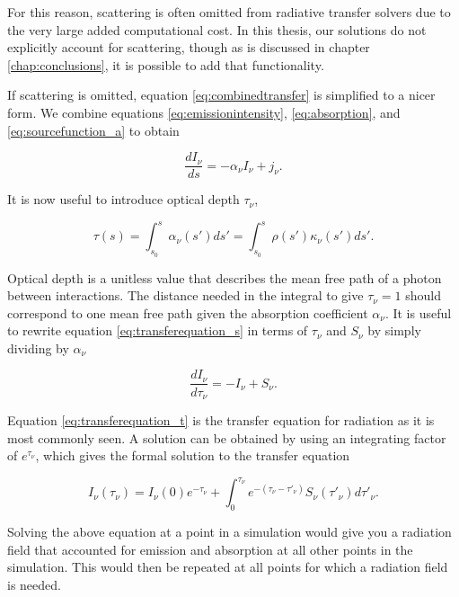 For this reason, scattering is often omitted from radiative transfer solvers due to the very large added computational cost. In this thesis, our solutions do not explicitly account for scattering, though as is discussed in chapter \ref{chap:conclusions}, it is possible to add that functionality.

If scattering is omitted, equation \ref{eq:combinedtransfer} is simplified to a nicer form. We combine equations \ref{eq:emissionintensity}, \ref{eq:absorption}, and \ref{eq:sourcefunction_a} to obtain

\begin{equation}
\label{eq:transferequation_s}
\frac{dI_{\nu}}{ds} = -\alpha_{\nu}I_{\nu} + j_{\nu}.
\end{equation}

It is now useful to introduce optical depth $\tau_{\nu}$,

\begin{equation}
\label{eq:opticaldepth}
\tau(s) = \int_{s_0}^{s} \alpha_{\nu}(s')ds' = \int_{s_0}^{s} \rho(s') \kappa_{\nu}(s') ds'.
\end{equation}

Optical depth is a unitless value that describes the mean free path of a photon between interactions. The distance needed in the integral to give $\tau_{\nu} = 1$ should correspond to one mean free path given the absorption coefficient $\alpha_{\nu}$. It is useful to rewrite equation \ref{eq:transferequation_s} in terms of $\tau_{\nu}$ and $S_{\nu}$ by simply dividing by $\alpha_{\nu}$

\begin{equation}
\label{eq:transferequation_t}
\frac{dI_{\nu}}{d\tau_{\nu}} = -I_{\nu} + S_{\nu}.
\end{equation}

Equation \ref{eq:transferequation_t} is the transfer equation for radiation as it is most commonly seen. A solution can be obtained by using an integrating factor of $e^{\tau_{\nu}}$, which gives the formal solution to the transfer equation

\begin{equation}
\label{eq:transferequationsolution}
I_{\nu}(\tau_{\nu}) = I_{\nu}(0)e^{-\tau_{\nu}} + \int_0^{\tau_{\nu}} e^{-(\tau_\nu - \tau'_{\nu})} S_{\nu}(\tau'_{\nu})d\tau'_{\nu}.
\end{equation}

Solving the above equation at a point in a simulation would give you a radiation field that accounted for emission and absorption at all other points in the simulation. This would then be repeated at all points for which a radiation field is needed.

